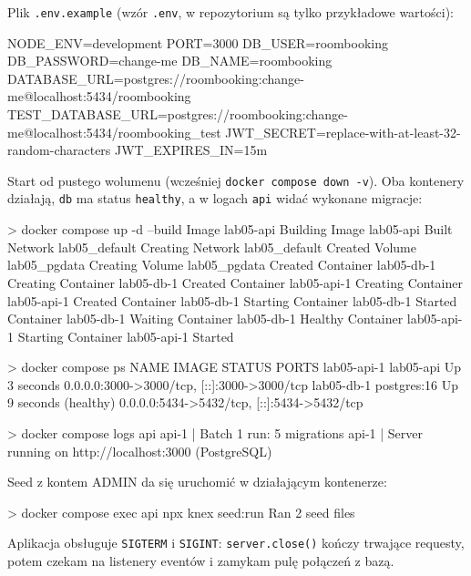 \documentclass[12pt,a4paper]{article}
\begin{document}
Plik \texttt{.env.example} (wzór \texttt{.env}, w repozytorium są tylko przykładowe wartości):

\begin{terminal}
NODE_ENV=development
PORT=3000
DB_USER=roombooking
DB_PASSWORD=change-me
DB_NAME=roombooking
DATABASE_URL=postgres://roombooking:change-me@localhost:5434/roombooking
TEST_DATABASE_URL=postgres://roombooking:change-me@localhost:5434/roombooking_test
JWT_SECRET=replace-with-at-least-32-random-characters
JWT_EXPIRES_IN=15m
\end{terminal}

Start od pustego wolumenu (wcześniej \texttt{docker compose down -v}). Oba kontenery działają, \texttt{db} ma status \texttt{healthy}, a w logach \texttt{api} widać wykonane migracje:

\begin{terminal}
> docker compose up -d --build
 Image lab05-api Building
 Image lab05-api Built
 Network lab05_default Creating
 Network lab05_default Created
 Volume lab05_pgdata Creating
 Volume lab05_pgdata Created
 Container lab05-db-1 Creating
 Container lab05-db-1 Created
 Container lab05-api-1 Creating
 Container lab05-api-1 Created
 Container lab05-db-1 Starting
 Container lab05-db-1 Started
 Container lab05-db-1 Waiting
 Container lab05-db-1 Healthy
 Container lab05-api-1 Starting
 Container lab05-api-1 Started
\end{terminal}

\begin{terminal}
> docker compose ps
NAME          IMAGE         STATUS                   PORTS
lab05-api-1   lab05-api     Up 3 seconds             0.0.0.0:3000->3000/tcp, [::]:3000->3000/tcp
lab05-db-1    postgres:16   Up 9 seconds (healthy)   0.0.0.0:5434->5432/tcp, [::]:5434->5432/tcp

> docker compose logs api
api-1  | Batch 1 run: 5 migrations
api-1  | Server running on http://localhost:3000 (PostgreSQL)
\end{terminal}

Seed z kontem ADMIN da się uruchomić w działającym kontenerze:

\begin{terminal}
> docker compose exec api npx knex seed:run
Ran 2 seed files
\end{terminal}

Aplikacja obsługuje \texttt{SIGTERM} i \texttt{SIGINT}: \texttt{server.close()} kończy trwające requesty, potem czekam na listenery eventów i zamykam pulę połączeń z bazą.
\end{document}
